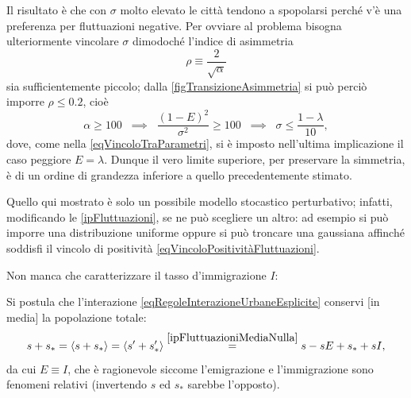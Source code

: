                 Il risultato è che con \(\sigma\) molto elevato le città tendono a spopolarsi perché v'è una preferenza per fluttuazioni negative. Per ovviare al problema bisogna ulteriormente vincolare \(\sigma\) dimodoché l'indice di asimmetria
                \begin{equation*}
                    \rho\equiv\frac2{\sqrt{\alpha}}
                \end{equation*}
                sia sufficientemente piccolo; dalla \cref{figTransizioneAsimmetria} si può perciò imporre \(\rho\leq0.2\), cioè
                \begin{equation}
                    \label{eqVincoloSimmetricoTraParametri}
                    \alpha\geq100
                    \;\;\implies\;\;
                    \frac{(1-E)^2}{\sigma^2}\geq100
                    \;\;\implies\;\;
                    \sigma\leq\frac{1-\lambda}{10},
                \end{equation}
                dove, come nella \cref{eqVincoloTraParametri}, si è imposto nell'ultima implicazione il caso peggiore \(E=\lambda\). Dunque il vero limite superiore, per preservare la simmetria, è di un ordine di grandezza inferiore a quello precedentemente stimato.
                
                \begin{oss}
                    Quello qui mostrato è solo un possibile modello stocastico perturbativo; infatti, modificando le \cref{ipFluttuazioni}, se ne può scegliere un altro: ad esempio si può imporre una distribuzione uniforme oppure si può troncare una gaussiana affinché soddisfi il vincolo di positività \cref{eqVincoloPositivitàFluttuazioni}.
                \end{oss}

                Non manca che caratterizzare il tasso d'immigrazione \(I\):

                \begin{ipo}%
                    Si postula che l'interazione \cref{eqRegoleInterazioneUrbaneEsplicite} conservi [in media] la popolazione totale:
                    \begin{equation*}
                        s+s_*=\langle s+s_*\rangle=
                        \langle s'+s_*'\rangle
                        \overset{\dimTesto{10}\ref{ipFluttuazioniMediaNulla}}{=}
                        s-sE+s_*+sI,
                    \end{equation*}
                    da cui \(E\equiv I\), che è ragionevole siccome l'emigrazione e l'immigrazione sono fenomeni relativi (invertendo \(s\) ed \(s_*\) sarebbe l'opposto).
                \end{ipo}

